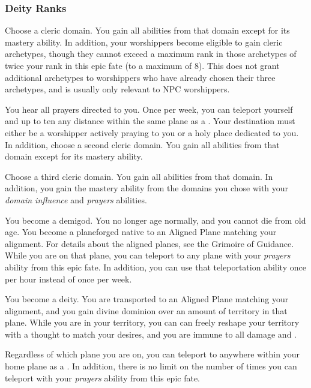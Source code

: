    \subsubsection{Deity Ranks}
       Choose a cleric domain.
      You gain all abilities from that domain except for its mastery ability.
      In addition, your worshippers become eligible to gain cleric archetypes, though they cannot exceed a maximum rank in those archetypes of twice your rank in this epic fate (to a maximum of 8).
      This does not grant additional archetypes to worshippers who have already chosen their three archetypes, and is usually only relevant to NPC worshippers.

       You hear all prayers directed to you.
      Once per week, you can teleport yourself and up to ten  any distance within the same plane as a .
      Your destination must either be a worshipper actively praying to you or a holy place dedicated to you.
      In addition, choose a second cleric domain.
      You gain all abilities from that domain except for its mastery ability.

       Choose a third cleric domain.
      You gain all abilities from that domain.
      In addition, you gain the mastery ability from the domains you chose with your \textit{domain influence} and \textit{prayers} abilities.

       You become a demigod.
      You no longer age normally, and you cannot die from old age.
      You become a planeforged native to an Aligned Plane matching your alignment.
      For details about the aligned planes, see the Grimoire of Guidance.
      While you are on that plane, you can teleport to any plane with your \textit{prayers} ability from this epic fate.
      In addition, you can use that teleportation ability once per hour instead of once per week.

       You become a deity.
      You are transported to an Aligned Plane matching your alignment, and you gain divine dominion over an amount of territory in that plane.
      While you are in your territory, you can can freely reshape your territory with a thought to match your desires, and you are immune to all damage and .

      Regardless of which plane you are on, you can teleport to anywhere within your home plane as a .
      In addition, there is no limit on the number of times you can teleport with your \textit{prayers} ability from this epic fate.

